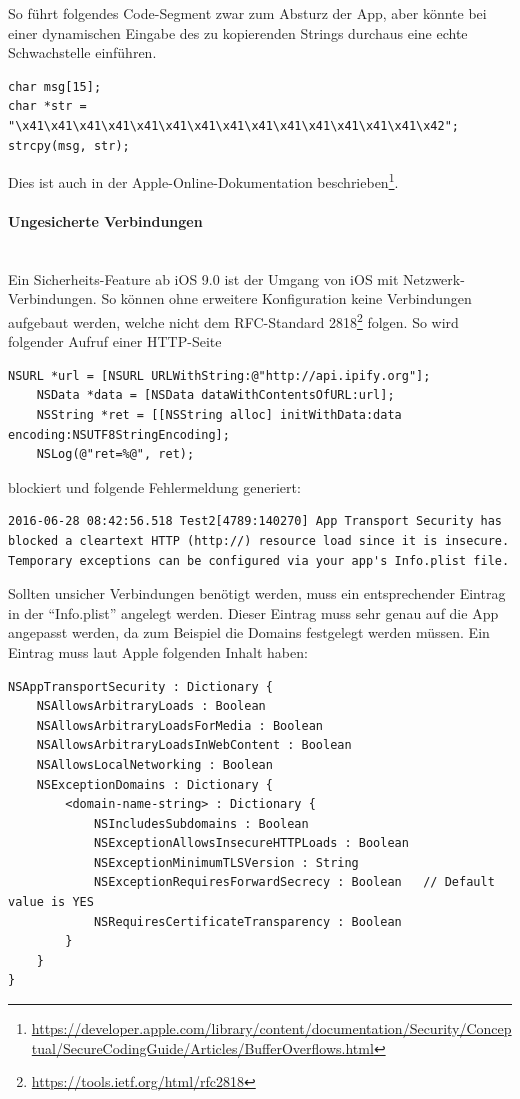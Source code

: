 So führt folgendes Code-Segment zwar zum Absturz der App, aber könnte bei einer dynamischen Eingabe des zu kopierenden Strings durchaus eine echte Schwachstelle einführen.
\begin{lstlisting}
char msg[15];
char *str = "\x41\x41\x41\x41\x41\x41\x41\x41\x41\x41\x41\x41\x41\x41\x42";
strcpy(msg, str);
\end{lstlisting}

Dies ist auch in der Apple-Online-Dokumentation beschrieben\footnote{\url{https://developer.apple.com/library/content/documentation/Security/Conceptual/SecureCodingGuide/Articles/BufferOverflows.html}}.

\paragraph{Ungesicherte Verbindungen}\label{ref:inseccon}$ $\\
Ein Sicherheits-Feature ab iOS 9.0 ist der Umgang von iOS mit Netzwerk-Verbindungen. So können ohne erweitere Konfiguration keine Verbindungen aufgebaut werden, welche nicht dem RFC-Standard 2818\footnote{\url{https://tools.ietf.org/html/rfc2818}} folgen. So wird folgender Aufruf einer HTTP-Seite
\begin{lstlisting}
NSURL *url = [NSURL URLWithString:@"http://api.ipify.org"];
    NSData *data = [NSData dataWithContentsOfURL:url];
    NSString *ret = [[NSString alloc] initWithData:data encoding:NSUTF8StringEncoding];
    NSLog(@"ret=%@", ret);
\end{lstlisting} blockiert und folgende Fehlermeldung generiert:
\begin{lstlisting}
2016-06-28 08:42:56.518 Test2[4789:140270] App Transport Security has blocked a cleartext HTTP (http://) resource load since it is insecure. Temporary exceptions can be configured via your app's Info.plist file.
\end{lstlisting}

Sollten unsicher Verbindungen benötigt werden, muss ein entsprechender Eintrag in der "`Info.plist"' angelegt werden. Dieser Eintrag muss sehr genau auf die App angepasst werden, da zum Beispiel die Domains festgelegt werden müssen. Ein Eintrag muss laut Apple\cite{AppleNSAppTransportSecurity} folgenden Inhalt haben:
\begin{lstlisting}
NSAppTransportSecurity : Dictionary {
    NSAllowsArbitraryLoads : Boolean
    NSAllowsArbitraryLoadsForMedia : Boolean
    NSAllowsArbitraryLoadsInWebContent : Boolean
    NSAllowsLocalNetworking : Boolean
    NSExceptionDomains : Dictionary {
        <domain-name-string> : Dictionary {
            NSIncludesSubdomains : Boolean
            NSExceptionAllowsInsecureHTTPLoads : Boolean
            NSExceptionMinimumTLSVersion : String
            NSExceptionRequiresForwardSecrecy : Boolean   // Default value is YES
            NSRequiresCertificateTransparency : Boolean
        }
    }
}
\end{lstlisting}

